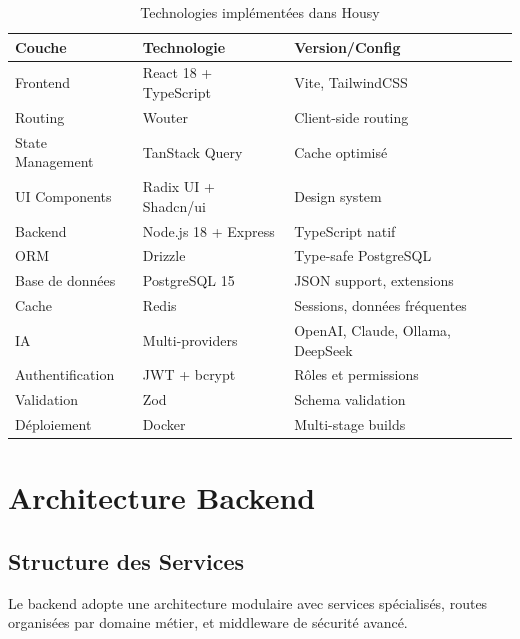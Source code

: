 \begin{table}[H]
\centering
\caption{Technologies implémentées dans Housy}
\label{tab:stack_technologique}
\begin{tabular}{|p{3cm}|p{4cm}|p{4cm}|}
\hline
\textbf{Couche} & \textbf{Technologie} & \textbf{Version/Config} \\
\hline
Frontend & React 18 + TypeScript & Vite, TailwindCSS \\
\hline
Routing & Wouter & Client-side routing \\
\hline
State Management & TanStack Query & Cache optimisé \\
\hline
UI Components & Radix UI + Shadcn/ui & Design system \\
\hline
Backend & Node.js 18 + Express & TypeScript natif \\
\hline
ORM & Drizzle & Type-safe PostgreSQL \\
\hline
Base de données & PostgreSQL 15 & JSON support, extensions \\
\hline
Cache & Redis & Sessions, données fréquentes \\
\hline
IA & Multi-providers & OpenAI, Claude, Ollama, DeepSeek \\
\hline
Authentification & JWT + bcrypt & Rôles et permissions \\
\hline
Validation & Zod & Schema validation \\
\hline
Déploiement & Docker & Multi-stage builds \\
\hline
\end{tabular}
\end{table}

\section{Architecture Backend}

\subsection{Structure des Services}

Le backend adopte une architecture modulaire avec services spécialisés, routes organisées par domaine métier, et middleware de sécurité avancé.

